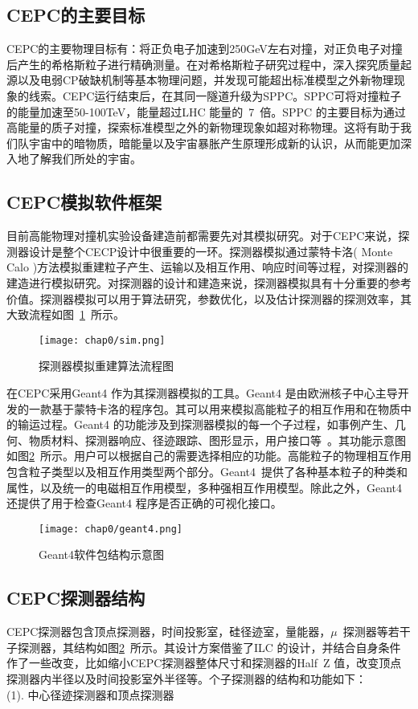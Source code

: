 \subsection{CEPC的主要目标}
CEPC的主要物理目标有：将正负电子加速到250GeV左右对撞，对正负电子对撞后产生的希格斯粒子进行精确测量。在对希格斯粒子研究过程中，深入探究质量起源以及电弱CP破缺机制等基本物理问题，并发现可能超出标准模型之外新物理现象的线索。CEPC运行结束后，在其同一隧道升级为SPPC。SPPC可将对撞粒子的能量加速至50-100TeV，能量超过LHC 能量的~7~倍。SPPC 的主要目标为通过高能量的质子对撞，探索标准模型之外的新物理现象如超对称物理。这将有助于我们队宇宙中的暗物质，暗能量以及宇宙暴胀产生原理形成新的认识，从而能更加深入地了解我们所处的宇宙。\\

\subsection{CEPC模拟软件框架}
目前高能物理对撞机实验设备建造前都需要先对其模拟研究。对于CEPC来说，探测器设计是整个CECP设计中很重要的一环。探测器模拟通过蒙特卡洛( Monte Calo )方法模拟重建粒子产生、运输以及相互作用、响应时间等过程，对探测器的建造进行模拟研究。对探测器的设计和建造来说，探测器模拟具有十分重要的参考价值。探测器模拟可以用于算法研究，参数优化，以及估计探测器的探测效率，其大致流程如图~\ref{fig:sim}~所示。
\begin{figure}[!htb]
  \centering
  \texttt{[image: chap0/sim.png]}
  \caption{探测器模拟重建算法流程图}
  \label{fig:sim}
\end{figure}

在CEPC采用Geant4 作为其探测器模拟的工具。Geant4 是由欧洲核子中心主导开发的一款基于蒙特卡洛的程序包。其可以用来模拟高能粒子的相互作用和在物质中的输运过程。Geant4 的功能涉及到探测器模拟的每一个子过程，如事例产生、几何、物质材料、探测器响应、径迹跟踪、图形显示，用户接口等~\cite{zhuxuezheng}。其功能示意图如图\ref{fig:geant4}~所示。用户可以根据自己的需要选择相应的功能。高能粒子的物理相互作用包含粒子类型以及相互作用类型两个部分。Geant4~提供了各种基本粒子的种类和属性，以及统一的电磁相互作用模型，多种强相互作用模型。除此之外，Geant4 还提供了用于检查Geant4 程序是否正确的可视化接口。
\begin{figure}[!htb]
  \centering
  \texttt{[image: chap0/geant4.png]}
  \caption{Geant4软件包结构示意图}
  \label{fig:geant4}
\end{figure}

\subsection{CEPC探测器结构}
CEPC探测器包含顶点探测器，时间投影室，硅径迹室，量能器，$\mu$~探测器等若干子探测器，其结构如图\ref{fig:geant4}~所示。其设计方案借鉴了ILC 的设计，并结合自身条件作了一些改变，比如缩小CEPC探测器整体尺寸和探测器的Half~Z 值，改变顶点探测器内半径以及时间投影室外半径等。个子探测器的结构和功能如下：\\
(1). 中心径迹探测器和顶点探测器

